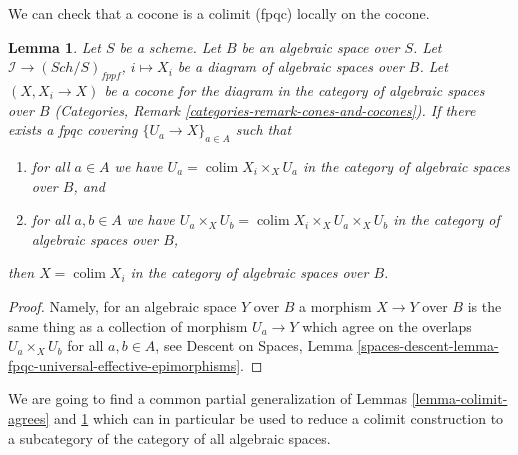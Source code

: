 \documentclass{stacks-project}
\theoremstyle{plain}
\newtheorem{lemma}[subsection]{Lemma}
\theoremstyle{definition}
\theoremstyle{remark}
\numberwithin{equation}{subsection}
\def\colim{\mathop{\mathrm{colim}}\nolimits}
\def\Sch{\mathit{Sch}}
\begin{document}
\noindent
We can check that a cocone is a colimit (fpqc) locally on the cocone.

\begin{lemma}
\label{lemma-pushout-fpqc-local}
Let $S$ be a scheme. Let $B$ be an algebraic space over $S$.
Let $\mathcal{I} \to (\Sch/S)_{fppf}$, $i \mapsto X_i$
be a diagram of algebraic spaces over $B$. Let $(X, X_i \to X)$
be a cocone for the diagram in the category of algebraic spaces over $B$
(Categories, Remark \ref{categories-remark-cones-and-cocones}).
If there exists a fpqc covering $\{U_a \to X\}_{a \in A}$ such that
\begin{enumerate}
\item for all $a \in A$ we have
$U_a = \colim X_i \times_X U_a$
in the category of algebraic spaces over $B$, and
\item for all $a, b \in A$ we have
$U_a \times_X U_b = \colim X_i \times_X U_a \times_X U_b$
in the category of algebraic spaces over $B$,
\end{enumerate}
then $X = \colim X_i$ in the category of algebraic spaces over $B$.
\end{lemma}

\begin{proof}
Namely, for an algebraic space $Y$ over $B$ a morphism $X \to Y$ over $B$
is the same thing as a collection of morphism $U_a \to Y$ which agree on
the overlaps $U_a \times_X U_b$ for all $a, b \in A$, see
Descent on Spaces, Lemma
\ref{spaces-descent-lemma-fpqc-universal-effective-epimorphisms}.
\end{proof}

\noindent
We are going to find a common partial generalization of
Lemmas \ref{lemma-colimit-agrees} and \ref{lemma-pushout-fpqc-local}
which can in particular be used to reduce a colimit construction to a
subcategory of the category of all algebraic spaces.
\end{document}
